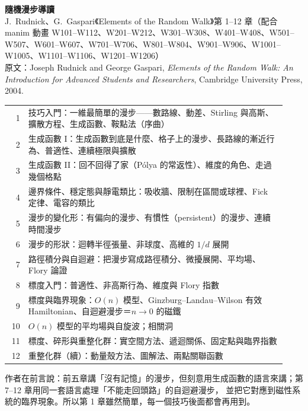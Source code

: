 \documentclass[11pt,a4paper]{article}
\begin{document}
\begin{center}
{\Large\bfseries 隨機漫步導讀}\\[4pt]
J.~Rudnick、G.~Gaspari《Elements of the Random Walk》第 1--12 章（配合 manim 動畫 W101--W112、W201--W212、W301--W308、W401--W408、W501--W507、W601--W607、W701--W706、W801--W804、W901--W906、W1001--W1005、W1101--W1106、W1201--W1206）\\[8pt]
{\small 原文：Joseph Rudnick and George Gaspari, \emph{Elements of the Random Walk: An Introduction for Advanced
Students and Researchers}, Cambridge University Press, 2004.}
\end{center}

\begin{keybox}
\small
\begin{tabular}{@{}rp{0.93\linewidth}@{}}
1 & 技巧入門：一維最簡單的漫步——數路線、動差、Stirling 與高斯、擴散方程、生成函數、鞍點法（序曲）\\
2 & 生成函數 I：生成函數到底是什麼、格子上的漫步、長路線的漸近行為、普適性、連續極限與擴散\\
3 & 生成函數 II：回不回得了家（Pólya 的常返性）、維度的角色、走過幾個格點\\
4 & 邊界條件、穩定態與靜電類比：吸收牆、限制在區間或球裡、Fick 定律、電容的類比\\
5 & 漫步的變化形：有偏向的漫步、有慣性（persistent）的漫步、連續時間漫步\\
6 & 漫步的形狀：迴轉半徑張量、非球度、高維的 $1/d$ 展開\\
7 & 路徑積分與自迴避：把漫步寫成路徑積分、微擾展開、平均場、Flory 論證\\
8 & 標度入門：普適性、非高斯行為、維度與 Flory 指數\\
9 & 標度與臨界現象：$O(n)$ 模型、Ginzburg--Landau--Wilson 有效 Hamiltonian、自迴避漫步＝$n\to0$ 的磁鐵\\
10 & $O(n)$ 模型的平均場與自旋波；相關洞\\
11 & 標度、碎形與重整化群：實空間方法、遞迴關係、固定點與臨界指數\\
12 & 重整化群（續）：動量殼方法、圖解法、兩點關聯函數
\end{tabular}

作者在前言說：前五章講「沒有記憶」的漫步，但刻意用生成函數的語言來講；第 7--12 章用同一套語言處理「不能走回頭路」的自迴避漫步，
並把它對應到磁性系統的臨界現象。所以第 1 章雖然簡單，每一個技巧後面都會再用到。
\end{keybox}
\end{document}

